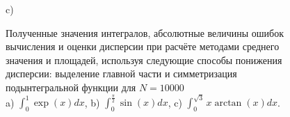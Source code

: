 \documentclass[
11pt,
master, %
subf, %
href, %
colorlinks=true, %
times, %
]{disser}
\begin{document}
\begin{figure}[h]
\begin{minipage}[h]{0.47\linewidth}
\end{minipage}
\vfill
\begin{minipage}[h]{1\linewidth}
 c) \\
\end{minipage}
\vfill
\caption{Полученные значения интегралов, абсолютные величины ошибок вычисления и оценки дисперсии при расчёте методами среднего значения и площадей, используя следующие способы понижения дисперсии: выделение главной части и симметризация подынтегральной функции для $N = 10000$\\
a) $\int_{0}^{1}\exp(x)dx$, b) $\int_{0}^{\frac{\pi}{2}} \sin(x)dx$, c) $\int_{0}^{\sqrt{3}} x\arctan(x)dx$.}
\label{ris:1}
\end{figure}

\newpage
\end{document}
